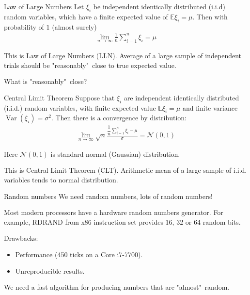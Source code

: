 \documentclass{beamer}
\begin{document}
\begin{frame}{Law of Large Numbers}
\justify
Let  $\xi_i$ be independent identically distributed (i.i.d) random variables, which have a finite expected value of $\mathbb{E}\xi_i=\mu$. Then with probability of 1 (almost surely)
\begin{align*}
\lim_{n \to \infty} \frac{1}{n} \sum\limits_{i=1}^{n}\xi_i = \mu
\end{align*}

\justify
This is \alert{Law of Large Numbers} (LLN). Average of a large sample of independent trials should be "reasonably"\ close to true expected value.

\justify
What is "reasonably"\ close?
\end{frame}



\begin{frame}{Central Limit Theorem}
\justify
Suppose that $\xi_i$ are independent identically distributed (i.i.d.) random variables, with finite expected value $\mathbb{E}\xi_i=\mu$ and finite variance $\operatorname{Var}(\xi_i) = \sigma^2$. Then there is a convergence by distribution:
\begin{align*}
\lim_{n \to \infty} \sqrt{n}\frac{\dfrac{1}{n}\sum\limits_{i=1}^{n}\xi_i - \mu}{\sigma} = \mathcal{N}(0, 1)
\end{align*}

\justify
Here $\mathcal{N}(0, 1)$ is standard normal (Gaussian) distribution.

\justify
This is \alert{Central Limit Theorem} (CLT). Arithmetic mean of a large sample of i.i.d. variables tends to normal distribution.
\end{frame}




\begin{frame}{Random numbers}
\justify
We need random numbers, lots of random numbers!

\justify
Most modern processors have a hardware random numbers generator. For example, RDRAND from x86 instruction set provides 16, 32 or 64 random bits.

\justify
Drawbacks:
\begin{itemize}
\item Performance (450 ticks on a Core i7-7700).
\item Unreproducible results.
\end{itemize}

\justify
We need a fast algorithm for producing numbers that are "almost"\ random.
\end{frame}
\end{document}
